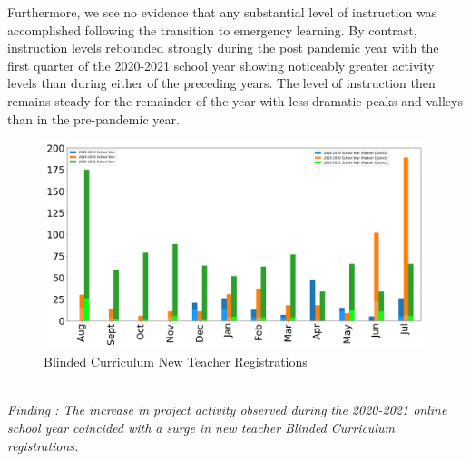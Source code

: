 \documentclass[sigconf,manuscript,review,anonymous]{acmart} %
\def\ts{TIPP\&SEE}
\newcommand{\Scratchencore}[0]{Blinded Curriculum}
\begin{document}
Furthermore, we see no evidence that any substantial level of instruction was accomplished
following the transition to emergency learning. By contrast, instruction levels rebounded
strongly during the post pandemic year with the first quarter of the 2020-2021 
school year showing noticeably greater activity levels than during either of the preceding 
years. The level of instruction then remains steady for the remainder of the year with less dramatic 
peaks and valleys than in the pre-pandemic year.
\begin{figure}
     \centering
     \includegraphics[width=\textwidth]{images/graphs/AllTeacherRegistrations.png}
     \caption{\Scratchencore{} New Teacher Registrations}
     \label{fig:teacher_registrations}
    
\end{figure}
\\
\textit{Finding : The increase in project activity observed
during the 2020-2021 online school year coincided with a surge in new teacher \Scratchencore{} registrations.}\\
\end{document}
